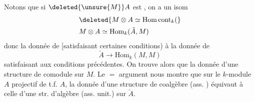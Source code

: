 Notons que si $\deleted{\unsure{M}}A$ est , on a un isom
\[
\begin{aligned}
 &\deleted{M\otimes A\simeq\mathrm{Hom}\,\mathrm{cont}_k(}\\
 &M\otimes A\simeq\mathrm{Hom}_k(\check A,M)
\end{aligned}
\]
donc la donnée de
[satisfaisant certaines conditions)  à la donnée de
\[
 \check A\longrightarrow\mathrm{Hom}_k(M,M)
\]
satisfaisant aux conditions précédentes. On trouve alors que la donnée d'une structure de comodule  sur $M$. Le $=$ argument nous montre que sur le $k$-module $A$ projectif de t.f. $A$, la donnée d'une structure de coalgèbre (ass. ) équivaut à celle d'une str. d'algèbre (ass. unit.) sur $\check A$.


